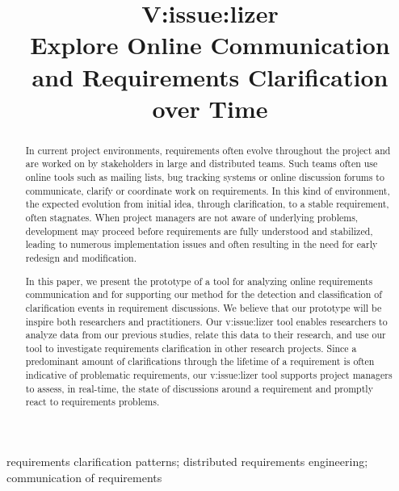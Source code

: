 
\title{V:issue:lizer\\Explore Online Communication and  Requirements Clarification over Time}


\author{
}

\maketitle


\begin{abstract}
In current project environments, requirements often evolve throughout the project and are worked on by stakeholders in large and distributed teams. 
Such teams often use online tools such as mailing lists, bug tracking systems or online discussion forums to communicate, clarify or coordinate work on requirements. 
In this kind of environment, the expected evolution from initial idea, through clarification, to a stable requirement, often stagnates. 
When project managers are not aware of underlying problems, development may proceed before requirements are fully understood and stabilized, leading to numerous implementation issues and often resulting in the need for early redesign and modification.

In this paper, we present the prototype of a tool for analyzing online requirements communication and for supporting our method for the detection and classification of clarification events in requirement discussions. 
We believe that our prototype will be inspire both researchers and practitioners. 
Our v:issue:lizer tool enables researchers to analyze data from our previous studies, relate this data to their research, and use our tool to investigate requirements clarification in other research projects. 
Since a predominant amount of clarifications through the lifetime of a requirement is often indicative of problematic requirements, our v:issue:lizer tool supports project managers to assess, in real-time, the state of discussions around a requirement and promptly react to requirements problems.
\end{abstract}

\begin{IEEEkeywords}
requirements clarification patterns; distributed requirements engineering; communication of requirements
\end{IEEEkeywords}
